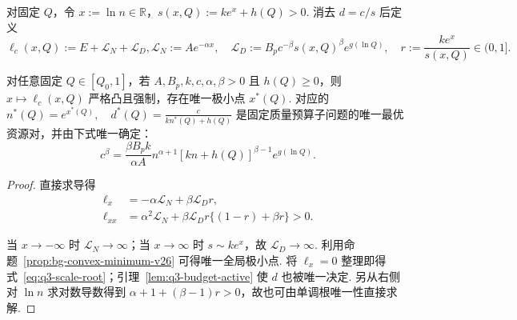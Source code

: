 \begin{definition}[对数尺度剖面]\label{def:q3-profile}
对固定 $Q$，令 $x:=\ln n\in\mathbb R$，$s(x,Q):=ke^x+h(Q)>0$. 消去 $d=c/s$ 后定义
\begin{subequations}\label{eq:q3-profile-v26}
   \begin{equation}
       \ell_c(x,Q):=E+\mathcal L_N+\mathcal L_D,
   \end{equation}
   \begin{equation}
       \mathcal L_N:=Ae^{-\alpha x},\quad \mathcal L_D:=B_pc^{-\beta}s(x,Q)^\beta e^{g(\ln Q)},\quad r:=\frac{ke^x}{s(x,Q)}\in(0,1].
   \end{equation}
\end{subequations}
\end{definition}
\begin{theorem}[固定质量的唯一预算最优资源对]\label{thm:q3-unique-scale}
对任意固定 $Q\in[Q_0,1]$，若 $A,B_p,k,c,\alpha,\beta>0$ 且 $h(Q)\ge0$，则 $x\mapsto\ell_c(x,Q)$ 严格凸且强制，存在唯一极小点 $x^*(Q)$. 对应的$n^*(Q)=e^{x^*(Q)},\quad d^*(Q)=\frac c{kn^*(Q)+h(Q)}$
是固定质量预算子问题的唯一最优资源对，并由下式唯一确定：
\begin{equation}\label{eq:q3-scale-root}
c^\beta=\frac{\beta B_pk}{\alpha A}
n^{\alpha+1}[kn+h(Q)]^{\beta-1}e^{g(\ln Q)}.
\end{equation}
\end{theorem}
\begin{proof}
直接求导得
\begin{subequations}\label{eq:q3-convex-derivatives}
    \begin{align}
\ell_x&=-\alpha\mathcal L_N+\beta\mathcal L_Dr,\\
\ell_{xx}&=\alpha^2\mathcal L_N+
\beta\mathcal L_Dr\{(1-r)+\beta r\}>0.
\end{align}
\end{subequations}

当 $x\to-\infty$ 时 $\mathcal L_N\to\infty$；当 $x\to\infty$ 时 $s\sim ke^x$，故 $\mathcal L_D\to\infty$. 利用命题~\ref{prop:bg-convex-minimum-v26} 可得唯一全局极小点. 将 $\ell_x=0$ 整理即得式~\eqref{eq:q3-scale-root}；引理~\ref{lem:q3-budget-active} 使 $d$ 也被唯一决定. 另从右侧对 $\ln n$ 求对数导数得到 $\alpha+1+(\beta-1)r>0$，故也可由单调根唯一性直接求解. 
\end{proof}


